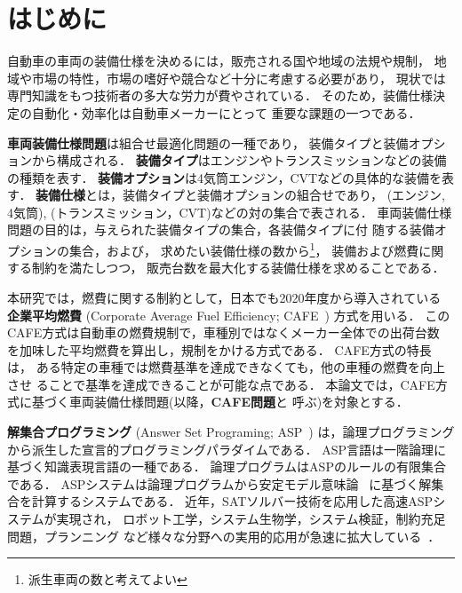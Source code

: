 \section{はじめに}


自動車の車両の装備仕様を決めるには，販売される国や地域の法規や規制，
地域や市場の特性，市場の嗜好や競合など十分に考慮する必要があり，
現状では専門知識をもつ技術者の多大な労力が費やされている．
そのため，装備仕様決定の自動化・効率化は自動車メーカーにとって
重要な課題の一つである．

\textbf{車両装備仕様問題}は組合せ最適化問題の一種であり，
装備タイプと装備オプションから構成される．
\textbf{装備タイプ}はエンジンやトランスミッションなどの装備の種類を表す．
\textbf{装備オプション}は4気筒エンジン，CVTなどの具体的な装備を表す．
\textbf{装備仕様}とは，装備タイプと装備オプションの組合せであり，
(エンジン, 4気筒), (トランスミッション，CVT)などの対の集合で表される．
車両装備仕様問題の目的は，与えられた装備タイプの集合，各装備タイプに付
随する装備オプションの集合，および，
求めたい装備仕様の数から\footnote{派生車両の数と考えてよい}，
装備および燃費に関する制約を満たしつつ，
販売台数を最大化する装備仕様を求めることである．

本研究では，燃費に関する制約として，日本でも2020年度から導入されている
\textbf{企業平均燃費}
(Corporate Average Fuel Efficiency; CAFE~\cite{metimlit18:cafe})
方式を用いる．
このCAFE方式は自動車の燃費規制で，車種別ではなくメーカー全体での出荷台数
を加味した平均燃費を算出し，規制をかける方式である．
CAFE方式の特長は，
ある特定の車種では燃費基準を達成できなくても，他の車種の燃費を向上させ
ることで基準を達成できることが可能な点である．
本論文では，CAFE方式に基づく車両装備仕様問題(以降，\textbf{CAFE問題}と
呼ぶ)を対象とする．

\textbf{解集合プログラミング}
(Answer Set Programing; ASP~\cite{%
  Baral03:cambridge,%
  Gelfond88:iclp,%
  Inoue08:jssst})
は，論理プログラミングから派生した宣言的プログラミングパラダイムである．
ASP言語は一階論理に基づく知識表現言語の一種である．
論理プログラムはASPのルールの有限集合である．
ASPシステムは論理プログラムから安定モデル意味論~\cite{Gelfond88:iclp}
に基づく解集合を計算するシステムである．
近年，SATソルバー技術を応用した高速ASPシステムが実現され，
ロボット工学，システム生物学，システム検証，制約充足問題，プランニング
など様々な分野への実用的応用が急速に拡大している~\cite{Gelfond16:aim}．


